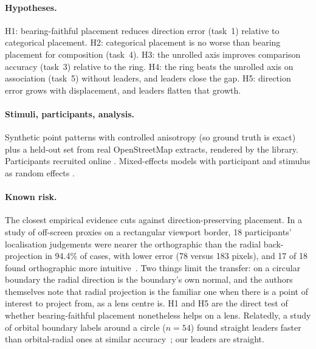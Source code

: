 \paragraph{Hypotheses.}
H1: bearing-faithful placement reduces direction error (task~1) relative to
categorical placement.
H2: categorical placement is no worse than bearing placement for composition
(task~4).
H3: the unrolled axis improves comparison accuracy (task~3) relative to the
ring.
H4: the ring beats the unrolled axis on association (task~5) without leaders,
and leaders close the gap.
H5: direction error grows with displacement, and leaders flatten that growth.

\paragraph{Stimuli, participants, analysis.} Synthetic point patterns with
controlled anisotropy (so ground truth is exact) plus a held-out set from real
OpenStreetMap extracts, rendered by the library. Participants recruited online
. Mixed-effects models with participant and stimulus as random
effects .

\paragraph{Known risk.} The closest empirical evidence cuts against
direction-preserving placement. In a study of off-screen proxies on a
rectangular viewport border, 18 participants' localisation judgements were
nearer the orthographic than the radial back-projection in 94.4\% of cases, with
lower error (78 versus 183 pixels), and 17 of 18 found orthographic more
intuitive~\cite{jackle2017topology}. Two things limit the transfer: on a
circular boundary the radial direction is the boundary's own normal, and the
authors themselves note that radial projection is the familiar one when there is
a point of interest to project from, as a lens centre is. H1 and H5 are the direct
test of whether bearing-faithful placement nonetheless helps on a lens.
Relatedly, a study of orbital boundary labels around a circle ($n=54$) found
straight leaders faster than orbital-radial ones at similar
accuracy~\cite{wallinger2026clarity}; our leaders are straight.
